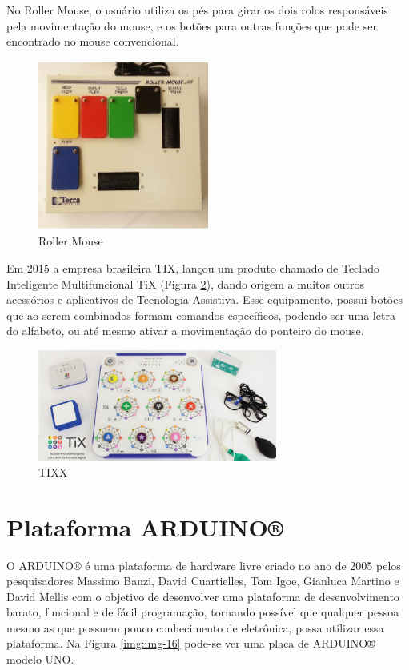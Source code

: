 \documentclass[
	12pt,			%
	openright,		%
	oneside,			%
	a4paper,			%
	chapter=TITLE,		%
	english,			%
	brazil,			%
	]{abntex2}
\begin{document}
No Roller Mouse, o usuário utiliza os pés para girar os dois rolos responsáveis pela movimentação do mouse, e os botões para outras funções que pode ser encontrado no mouse convencional.

\begin{figure}[H]
	\centering
		\includegraphics[width=0.5\textwidth]{./img/img-9.jpg}
		\caption{Roller Mouse}
		\label{img:img-9}
\end{figure}

Em 2015 a empresa brasileira TIX, lançou um produto chamado de Teclado Inteligente Multifuncional TiX (Figura \ref{img:img-14}), dando origem a muitos outros acessórios e aplicativos de Tecnologia Assistiva. Esse equipamento, possui botões que ao serem combinados formam comandos específicos, podendo ser uma letra do alfabeto, ou até mesmo ativar a movimentação do ponteiro do mouse.

\begin{figure}[H]
	\centering
		\includegraphics[width=0.7\textwidth]{./img/img-14.png}
		\caption{TIXX}
		\label{img:img-14}
\end{figure}

\section{Plataforma ARDUINO®}

O ARDUINO® é uma plataforma de hardware livre criado no ano de 2005 pelos pesquisadores Massimo Banzi, David Cuartielles, Tom Igoe, Gianluca Martino e David Mellis com o objetivo de desenvolver uma plataforma de desenvolvimento barato, funcional e de fácil programação, tornando possível que qualquer pessoa mesmo as que possuem pouco conhecimento de eletrônica, possa utilizar essa plataforma. Na Figura \ref{img:img-16} pode-se ver uma placa de ARDUINO® modelo UNO.
\end{document}
